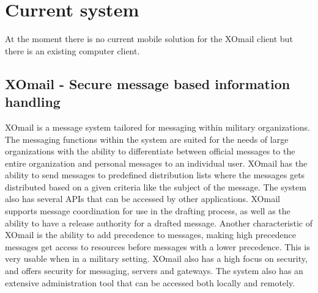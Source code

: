\section{Current system}

At the moment there is no current mobile solution for the XOmail client but there
is an existing computer client.

\subsection{XOmail - Secure message based information handling}

XOmail is a message system tailored for messaging within military organizations. The messaging functions within the system are suited for the needs of large
organizations with the ability to differentiate between official messages to
the entire organization and personal messages to an individual user.
\newline
\newline
XOmail has the ability to send messages to predefined distribution lists where the
messages gets distributed based on a given criteria like the subject of the
message. The system also has several APIs that can be accessed by other
applications. XOmail supports message coordination for use in the drafting
process, as well as the ability to have a release authority for a drafted message.
\newline
\newline 
Another characteristic of XOmail is the ability to add precedence to messages, making high precedence messages get access to resources before messages with a lower precedence. This is very usable when in a military setting.
\newline
\newline
XOmail also has a high focus on security, and offers security for messaging, servers
and gateways.
\newline
\newline
The system also has an extensive administration tool that can be accessed both locally and remotely.